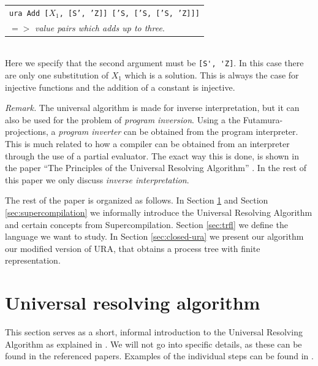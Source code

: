 \documentclass[10pt]{../sigplanconf}
\begin{document}
\begin{tabular}{l}
  \texttt{ura Add [$X_1$, [S', 'Z]] ['S, ['S, ['S, 'Z]]]} \\
   \quad $=>$ \textit{value pairs which adds up to three}.
\end{tabular}\\

Here we specify that the second argument must be \verb|[S', 'Z]|. In
this case there are only one substitution of $X_1$ which is a
solution. This is always the case for injective functions and the
addition of a constant is injective.

\textit{Remark.} The universal algorithm is made for inverse
interpretation, but it can also be used for the problem of
\textit{program inversion}. Using a the Futamura-projections, a
\textit{program inverter} can be obtained from the program
interpreter. This is much related to how a compiler can be obtained
from an interpreter through the use of a partial evaluator. The exact
way this is done, is shown in the paper ``The Principles of the
Universal Resolving Algorithm'' \cite{abramov2000universal}. In the
rest of this paper we only discuss \textit{inverse interpretation}.

The rest of the paper is organized as follows. In Section
\ref{sec:ura} and Section \ref{sec:supercompilation} we informally
introduce the Universal Resolving Algorithm and certain concepts from
Supercompilation. Section \ref{sec:trfl} we define the language we
want to study. In Section \ref{sec:closed-ura} we present our
algorithm our modified version of URA, that obtains a process tree
with finite representation.


\section{Universal resolving algorithm}
\label{sec:ura}
This section serves as a short, informal introduction to the Universal
Resolving Algorithm as explained in \cite{abramov2000universal,
  abramov2002universal, abramov2002principles}. We will not go into
specific details, as these can be found in the referenced
papers. Examples of the individual steps can be found in
\cite{abramov2000universal}.
\end{document}

